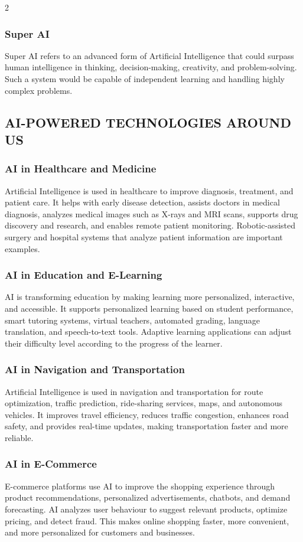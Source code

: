 \begin{multicols}{2}
  \subsubsection*{Super AI}
  Super AI refers to an advanced form of Artificial Intelligence that could surpass human intelligence in thinking, decision-making, creativity, and problem-solving. Such a system would be capable of independent learning and handling highly complex problems.

  \subsection*{\centering\uppercase{AI-Powered Technologies Around Us}}
  \subsubsection*{AI in Healthcare and Medicine}
  Artificial Intelligence is used in healthcare to improve diagnosis, treatment, and patient care. It helps with early disease detection, assists doctors in medical diagnosis, analyzes medical images such as X-rays and MRI scans, supports drug discovery and research, and enables remote patient monitoring. Robotic-assisted surgery and hospital systems that analyze patient information are important examples.

  \subsubsection*{AI in Education and E-Learning}
  AI is transforming education by making learning more personalized, interactive, and accessible. It supports personalized learning based on student performance, smart tutoring systems, virtual teachers, automated grading, language translation, and speech-to-text tools. Adaptive learning applications can adjust their difficulty level according to the progress of the learner.

  \subsubsection*{AI in Navigation and Transportation}
  Artificial Intelligence is used in navigation and transportation for route optimization, traffic prediction, ride-sharing services, maps, and autonomous vehicles. It improves travel efficiency, reduces traffic congestion, enhances road safety, and provides real-time updates, making transportation faster and more reliable.

  \subsubsection*{AI in E-Commerce}
  E-commerce platforms use AI to improve the shopping experience through product recommendations, personalized advertisements, chatbots, and demand forecasting. AI analyzes user behaviour to suggest relevant products, optimize pricing, and detect fraud. This makes online shopping faster, more convenient, and more personalized for customers and businesses.


\end{multicols}
